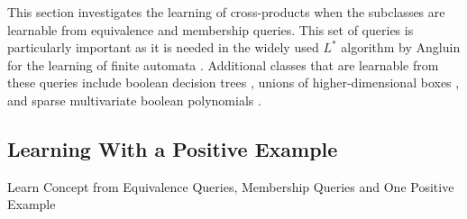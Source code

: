 This section investigates the learning of cross-products when the subclasses are learnable from equivalence and membership queries.   This set of queries is particularly important as it is needed in the widely used $L^*$ algorithm by Angluin for the learning of finite automata \cite{angluin1987learning}.  Additional classes that are learnable from these queries include boolean decision trees \cite{bshouty1993exact}, unions of higher-dimensional boxes \cite{goldberg1994learning}, and sparse multivariate boolean polynomials \cite{schapire1993learning}.



\subsection{Learning With a Positive Example}

\begin{algorithm}[H]
\label{eqmemandpos}
\SetAlgoLined
{}



\caption{Learn Concept from Equivalence Queries, Membership Queries and One Positive Example}
\end{algorithm}

